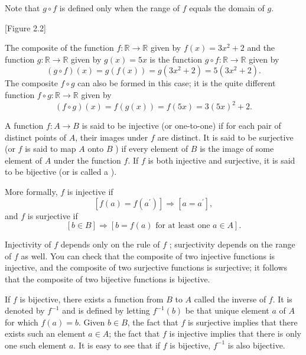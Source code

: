 Note that \(g \circ f\) is defined only when the range of \(f\) equals the domain of \(g\).

[Figure 2.2]
\begin{centeredblock}
 \begin{example}
\label{ex:\thesection.\theexample}
 The composite of the function \(f : \mathbb{R} \rightarrow \mathbb{R}\) given by \(f(x) = 3x^{2} + 2\) and the function \(g : \mathbb{R} \rightarrow \mathbb{R}\) given by \(g(x) = {5x}\) is the function \(g \circ f : \mathbb{R} \rightarrow \mathbb{R}\) given by
 \[
 ({g \circ f}) (x) = g({f(x) }) = g({3x^{2} + 2}) = 5({3x^{2} + 2}).
 \]
 The composite \(f \circ g\) can also be formed in this case; it is the quite different function \(f \circ g : \mathbb{R} \rightarrow \mathbb{R}\) given by
 \[
 ({f \circ g}) (x) = f({g(x) }) = f({5x}) = 3{( 5x) }^{2} + 2.
 \]
 \end{example}
\end{centeredblock}

\begin{definition}
 A function \(f : A \rightarrow B\) is said to be injective (or one-to-one) if for each pair of distinct points of \(A\), their images under \(f\) are distinct. It is said to be surjective (or \(f\) is said to map \(A\) onto \(B\) ) if every element of \(B\) is the image of some element of \(A\) under the function \(f\). If \(f\) is both injective and surjective, it is said to be bijective (or is called a ).
\end{definition}

More formally, \(f\) is injective if
\[
[{f(a) = f(a^{\prime }) }] \Rightarrow [{a = a^{\prime }}] ,
\]
and \(f\) is surjective if
\[
[{b \in B}] \Rightarrow [{b = f(a) \text{ for at least one }a \in A}] .
\]

Injectivity of \(f\) depends only on the rule of \(f\) ; surjectivity depends on 
the range of \(f\) as well. You can check that the composite of two injective functions 
is injective, and the composite of two surjective functions is surjective; 
it follows that the composite of two bijective functions is bijective.

If \(f\) is bijective, there exists a function from \(B\) to \(A\) called the inverse of \(f\). 
It is denoted by \(f^{-1}\) and is defined by letting \(f^{-1}(b)\) be that 
unique element \(a\) of \(A\) for which \(f(a) = b\). Given \(b \in B\), 
the fact that \(f\) is surjective implies that there exists such an element \(a \in A\); 
the fact that \(f\) is injective implies that there is only one such element \(a\). 
It is easy to see that if \(f\) is bijective, \(f^{-1}\) is also bijective.

